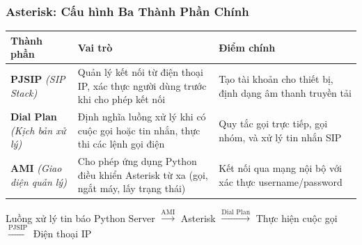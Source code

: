 \begin{frame}
\frametitle{Asterisk: Cấu hình Ba Thành Phần Chính}

\begin{table}[htbp]
\centering
\footnotesize
\begin{tabular}{|l|p{5cm}|p{4cm}|}
\hline
\textbf{Thành phần} & \textbf{Vai trò} & \textbf{Điểm chính} \\
\hline
\textbf{PJSIP} \newline
\textit{(SIP Stack)} & 
Quản lý kết nối từ điện thoại IP, xác thực người dùng trước khi cho phép kết nối &
Tạo tài khoản cho thiết bị, định dạng âm thanh truyền tải \\
\hline
\textbf{Dial Plan} \newline
\textit{(Kịch bản xử lý)} & 
Định nghĩa luồng xử lý khi có cuộc gọi hoặc tin nhắn, thực thi các lệnh gọi điện &
Quy tắc gọi trực tiếp, gọi nhóm, và xử lý tin nhắn SIP \\
\hline
\textbf{AMI} \newline
\textit{(Giao diện quản lý)} & 
Cho phép ứng dụng Python điều khiển Asterisk từ xa (gọi, ngắt máy, lấy trạng thái) &
Kết nối qua mạng nội bộ với xác thực username/password \\
\hline
\end{tabular}
\end{table}

\vspace{0.2cm}
\begin{alertblock}{Luồng xử lý tin báo}
\centering
\small
Python Server $\xrightarrow{\text{AMI}}$ Asterisk $\xrightarrow{\text{Dial Plan}}$ Thực hiện cuộc gọi $\xrightarrow{\text{PJSIP}}$ Điện thoại IP
\end{alertblock}

\end{frame}
